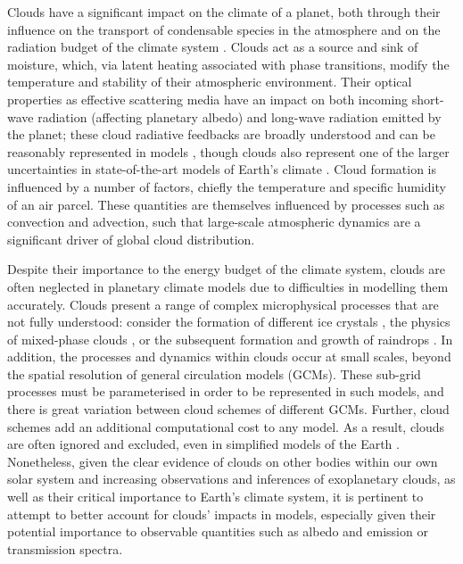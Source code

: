 Clouds have a significant impact on the climate of a planet, both through their influence on the transport of condensable species in the atmosphere and on the radiation budget of the climate system \citep{trenberth2012-Tracking}. Clouds act as a source and sink of moisture, which, via latent heating associated with phase transitions, modify the temperature and stability of their atmospheric environment. Their optical properties as effective scattering media have an impact on both incoming short-wave radiation (affecting planetary albedo) and long-wave radiation emitted by the planet; these cloud radiative feedbacks are broadly understood \citep{webster1994-Role, pierrehumbert2010-Principles} and can be reasonably represented in models \citep{rose2021-Climate}, though clouds also represent one of the larger uncertainties in state-of-the-art models of Earth's climate \citep{ceppi2017-Cloud}. Cloud formation is influenced by a number of factors, chiefly the temperature and specific humidity of an air parcel. These quantities are themselves influenced by processes such as convection and advection, such that large-scale atmospheric dynamics are a significant driver of global cloud distribution.

Despite their importance to the energy budget of the climate system, clouds are often neglected in planetary climate models due to difficulties in modelling them accurately. Clouds present a range of complex microphysical processes that are not fully understood: consider the formation of different ice crystals \citep{storelvmo2015-WegenerBergeronFindeisen}, the physics of mixed-phase clouds \citep{korolev2003-Supersaturation}, or the subsequent formation and growth of raindrops \citep{bergeron1935-Physics}. In addition, the processes and dynamics within clouds occur at small scales, beyond the spatial resolution of general circulation models (GCMs). These sub-grid processes must be parameterised in order to be represented in such models, and there is great variation between cloud schemes of different GCMs. Further, cloud schemes add an additional computational cost to any model. As a result, clouds are often ignored and excluded, even in simplified models of the Earth \citep{thomson2019-Hierarchical}. Nonetheless, given the clear evidence of clouds on other bodies within our own solar system and increasing observations and inferences of exoplanetary clouds, as well as their critical importance to Earth's climate system, it is pertinent to attempt to better account for clouds' impacts in models, especially given their potential importance to observable quantities such as albedo and emission or transmission spectra. 


